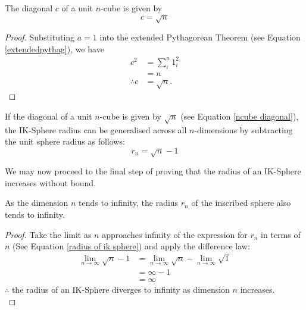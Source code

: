 \begin{corollary} The diagonal $c$ of a unit $n$-cube is given by
\begin{equation} \label{ncube diagonal}
    c = \sqrt{n}
\end{equation}
\end{corollary}
\begin{proof}
    Substituting $a=1$ into the extended Pythagorean Theorem (see Equation \ref{extendedpythag}), we have
    \begin{align*}
        c^2 &= \sum_{i}^{n}1_i^2\\
        &=n\\
        \therefore c &= \sqrt{n}.
    \end{align*}
\end{proof}

If the diagonal of a unit $n$-cube is given by $\sqrt{n}$ (see Equation \ref{ncube diagonal}), the IK-Sphere radius can be generalised across all $n$-dimensions by subtracting the unit sphere radius as follows:
\begin{equation}\label{radius of ik sphere}
    r_n = \sqrt{n}-1
\end{equation}

We may now proceed to the final step of proving that the radius of an IK-Sphere increases without bound.

\begin{theorem}
As the dimension $n$ tends to infinity, the radius $r_n$ of the inscribed sphere also tends to infinity.
\end{theorem}
\begin{proof}
Take the limit as $n$ approaches infinity of the expression for $r_n$ in terms of $n$ (See Equation \ref{radius of ik sphere}) and apply the difference law:
\begin{align*}
    \lim_{n\to\infty} \sqrt{n}-1 &= \lim_{n\to\infty} \sqrt{n} - \lim_{n\to\infty} \sqrt{1}\\
    &=\infty - 1\\
    &=\infty
\end{align*}
$\therefore$ the radius of an IK-Sphere diverges to infinity as dimension $n$ increases.\\
\end{proof}

